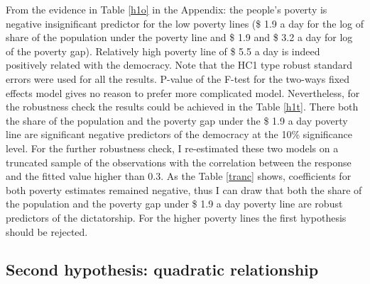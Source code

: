 \documentclass[a4paper, 12pt]{article}
\begin{document}
    From the evidence in Table \ref{h1o} in the Appendix: the people's poverty is negative insignificant predictor for the low poverty lines (\$ 1.9 a day for the log of share of the population under the poverty line and \$ 1.9 and \$ 3.2 a day for log of the poverty gap). Relatively high poverty line of \$ 5.5 a day is indeed positively related with the democracy. Note that the HC1 type robust standard errors were used for all the results. P-value of the F-test for the two-ways fixed effects model gives no reason to prefer more complicated model. Nevertheless, for the robustness check the results could be achieved in the Table \ref{h1t}. There both the share of the population and the poverty gap under the \$ 1.9 a day poverty line are significant negative predictors of the democracy at the 10\% significance level. For the further robustness check, I re-estimated these two models on a truncated sample of the observations with the correlation between the response and the fitted value higher than 0.3. As the Table \ref{tranc} shows, coefficients for both poverty estimates remained negative, thus I can draw that both the share of the population and the poverty gap under \$ 1.9 a day poverty line are robust predictors of the dictatorship. For the higher poverty lines the first hypothesis should be rejected.

    \subsection{Second hypothesis: quadratic relationship}
    
\end{document}
